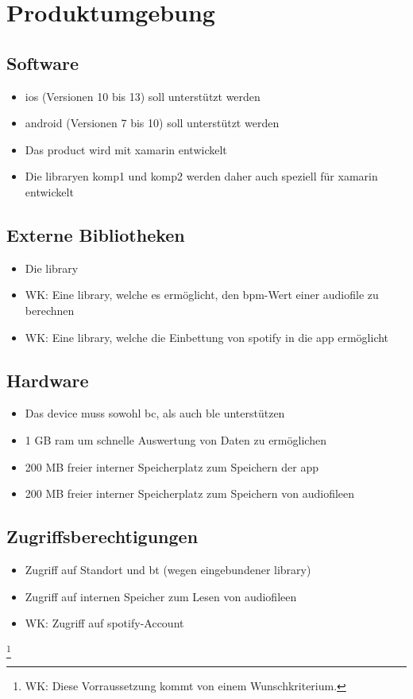 \documentclass[../pflichtenheft.tex]{subfiles}
\begin{document}
	\section{Produktumgebung}
		\subsection{Software}
			\begin{itemize}
				\item \gls{ios} (Versionen 10 bis 13) soll unterstützt werden
				\item \Gls{android} (Versionen 7 bis 10) soll unterstützt werden
				\item Das \Gls{product} wird mit \Gls{xamarin} entwickelt
				\item Die \Gls{library}en \Gls{komp1} und \Gls{komp2} werden daher auch speziell für \Gls{xamarin} entwickelt
			\end{itemize}

		\subsection{Externe Bibliotheken}
			\begin{itemize}
				\item Die \Gls{library}  
				\item WK: Eine \Gls{library}, welche es ermöglicht, den \Gls{bpm}-Wert einer \gls{audiofile} zu berechnen
				\item WK: Eine \Gls{library}, welche die Einbettung von \Gls{spotify} in die \Gls{app} ermöglicht
			\end{itemize}

		\subsection{Hardware}
			\begin{itemize}
				\item Das \Gls{device} muss sowohl \Gls{bc}, als auch \Gls{ble} unterstützen
				\item 1 GB \Gls{ram} um schnelle Auswertung von Daten zu ermöglichen
				\item 200 MB freier interner Speicherplatz zum Speichern der \Gls{app}
				\item 200 MB freier interner Speicherplatz zum Speichern von \Gls{audiofile}en
			\end{itemize}

		\subsection{Zugriffsberechtigungen}
			\begin{itemize}
				\item Zugriff auf Standort und \Gls{bt} (wegen eingebundener \Gls{library})
				\item Zugriff auf internen Speicher zum Lesen von \Gls{audiofile}en
				\item WK: Zugriff auf \Gls{spotify}-Account
			\end{itemize}

	\let\thefootnote\relax\footnote{WK: Diese Vorraussetzung kommt von einem Wunschkriterium.}
\end{document}
